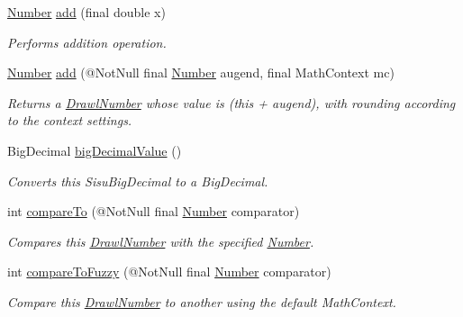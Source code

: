 \begin{DoxyCompactItemize}
\hyperlink{interfacecom_1_1aarrelaakso_1_1drawl_1_1_number}{Number} \hyperlink{classcom_1_1aarrelaakso_1_1drawl_1_1_drawl_number_adf7216ecb118a2bbd1d4aba6a51110bc}{add} (final double x)
\begin{DoxyCompactList}\small\item\em Performs addition operation. \end{DoxyCompactList}\item 
\hyperlink{interfacecom_1_1aarrelaakso_1_1drawl_1_1_number}{Number} \hyperlink{classcom_1_1aarrelaakso_1_1drawl_1_1_drawl_number_a1ecd88ae492b29cf92013f7441f488f8}{add} (@Not\+Null final \hyperlink{interfacecom_1_1aarrelaakso_1_1drawl_1_1_number}{Number} augend, final Math\+Context mc)
\begin{DoxyCompactList}\small\item\em Returns a \hyperlink{classcom_1_1aarrelaakso_1_1drawl_1_1_drawl_number}{Drawl\+Number} whose value is (this + augend), with rounding according to the context settings. \end{DoxyCompactList}\item 
Big\+Decimal \hyperlink{classcom_1_1aarrelaakso_1_1drawl_1_1_drawl_number_acf97abc572acd173a4d8cd6c5b5c2ecd}{big\+Decimal\+Value} ()
\begin{DoxyCompactList}\small\item\em Converts this Sisu\+Big\+Decimal to a Big\+Decimal. \end{DoxyCompactList}\item 
int \hyperlink{classcom_1_1aarrelaakso_1_1drawl_1_1_drawl_number_a40d2c6535f85306aaf5b6e5886c51266}{compare\+To} (@Not\+Null final \hyperlink{interfacecom_1_1aarrelaakso_1_1drawl_1_1_number}{Number} comparator)
\begin{DoxyCompactList}\small\item\em Compares this \hyperlink{classcom_1_1aarrelaakso_1_1drawl_1_1_drawl_number}{Drawl\+Number} with the specified \hyperlink{interfacecom_1_1aarrelaakso_1_1drawl_1_1_number}{Number}. \end{DoxyCompactList}\item 
int \hyperlink{classcom_1_1aarrelaakso_1_1drawl_1_1_drawl_number_ab2624aa98592bb5dd20990c7f5921024}{compare\+To\+Fuzzy} (@Not\+Null final \hyperlink{interfacecom_1_1aarrelaakso_1_1drawl_1_1_number}{Number} comparator)
\begin{DoxyCompactList}\small\item\em Compare this \hyperlink{classcom_1_1aarrelaakso_1_1drawl_1_1_drawl_number}{Drawl\+Number} to another using the default Math\+Context. \end{DoxyCompactList}\item 

\end{DoxyCompactItemize}

